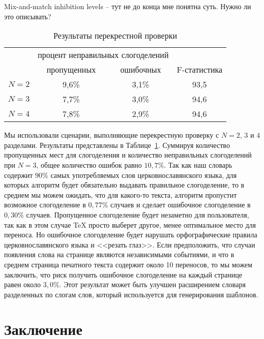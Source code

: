 \documentclass[12pt,a4paper,oneside]{extarticle}
\begin{document}
Mix-and-match inhibition levels -- тут не до конца мне понятна суть. Нужно ли это описывать?

\begin{table}[ht]
\centering
\caption{Результаты перекрестной проверки \label{validation_results}}
\begin{tabular}{cccc}
		&	\multicolumn{2}{c}{процент неправильных слогоделений} & \\
		&	пропущенных		& ошибочных	& F-статистика \\
\hline
$N = 2$	& 	9,6\%			& 	3,1\% 	&	93,5 \\
$N = 3$ 	& 	7,7\%			& 	3,0\% 	& 	94,6	\\
$N = 4$ 	&	7,8\%			& 	2,9\% 	& 	94,6	\\
\hline
\end{tabular}
\end{table}

Мы использовали сценарии, выполняющие перекрестную проверку с $N = 2$, $3$ и $4$ разделами. Результаты представлены в Таблице~\ref{validation_results}. Суммируя количество пропущенных мест для слогоделения и количество неправильных слогоделений при  $N = 3$, общее количество ошибок равно $10,7\%$.  Так как наш словарь содержит $90\%$ самых употребляемых слов церковнославянского языка, для которых алгоритм будет обязательно выдавать правильное слогоделение, то в среднем мы можем ожидать, что для какого-то текста, алгоритм пропустит возможное слогоделение в $0,77\%$  случаев и сделает ошибочное слогоделение в $0,30\%$ случаев. Пропущенное слогоделение будет незаметно для пользователя, так как в этом случае \TeX{} просто выберет другое, менее оптимальное место для переноса. Но ошибочное слогоделение будет нарушать орфографические правила церковнославянского языка и <<резать глаз>>. Если предположить, что случаи появления слова на странице являются независимыми событиями, и что в среднем страница печатного текста содержит около 10 переносов, то мы можем заключить, что риск получить ошибочное слогоделение на каждый странице равен около $3,0\%$. Этот результат может быть улучшен расширением словаря разделенных по слогам слов, который используется для генерирования шаблонов.

\section{Заключение}
\end{document}
